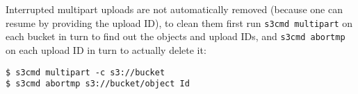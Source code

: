 Interrupted multipart uploads are not automatically removed (because one can
resume by providing the upload ID), to clean them first run
\verb|s3cmd multipart| on each bucket in turn to find out the objects and upload
IDs, and \verb|s3cmd abortmp| on each upload ID in turn to actually delete it:

\begin{lstlisting}
$ s3cmd multipart -c s3://bucket
$ s3cmd abortmp s3://bucket/object Id
\end{lstlisting}
